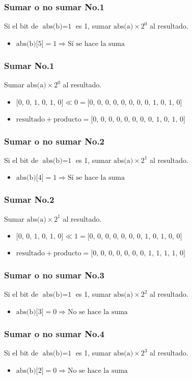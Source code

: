 \documentclass{beamer}
\begin{document}
\begin{frame}
\frametitle{Sumar o no sumar No.1}
Si el bit de $\text{abs(b)}=\text{1}$ es 1, sumar $\text{abs(a)}\times\text{2}^{\text{0}}$ al resultado.
\begin{itemize}
\item $\text{abs(b)[5]}=\text{1}\Longrightarrow\text{Sí se hace la suma}$
\end{itemize}
\end{frame}
\begin{frame}
\frametitle{Sumar No.1}
Sumar $\text{abs(a)}\times\text{2}^{\text{0}}$ al resultado.
\begin{itemize}
\item $\text{[0, 0, 1, 0, 1, 0]}\ll\text{0}=\text{[0, 0, 0, 0, 0, 0, 0, 0, 1, 0, 1, 0]}$
\item $\text{resultado}+\text{producto}=\text{[0, 0, 0, 0, 0, 0, 0, 0, 1, 0, 1, 0]}$
\end{itemize}
\end{frame}
\begin{frame}
\frametitle{Sumar o no sumar No.2}
Si el bit de $\text{abs(b)}=\text{1}$ es 1, sumar $\text{abs(a)}\times\text{2}^{\text{1}}$ al resultado.
\begin{itemize}
\item $\text{abs(b)[4]}=\text{1}\Longrightarrow\text{Sí se hace la suma}$
\end{itemize}
\end{frame}
\begin{frame}
\frametitle{Sumar No.2}
Sumar $\text{abs(a)}\times\text{2}^{\text{1}}$ al resultado.
\begin{itemize}
\item $\text{[0, 0, 1, 0, 1, 0]}\ll\text{1}=\text{[0, 0, 0, 0, 0, 0, 0, 1, 0, 1, 0, 0]}$
\item $\text{resultado}+\text{producto}=\text{[0, 0, 0, 0, 0, 0, 0, 1, 1, 1, 1, 0]}$
\end{itemize}
\end{frame}
\begin{frame}
\frametitle{Sumar o no sumar No.3}
Si el bit de $\text{abs(b)}=\text{1}$ es 1, sumar $\text{abs(a)}\times\text{2}^{\text{2}}$ al resultado.
\begin{itemize}
\item $\text{abs(b)[3]}=\text{0}\Longrightarrow\text{No se hace la suma}$
\end{itemize}
\end{frame}
\begin{frame}
\frametitle{Sumar o no sumar No.4}
Si el bit de $\text{abs(b)}=\text{1}$ es 1, sumar $\text{abs(a)}\times\text{2}^{\text{3}}$ al resultado.
\begin{itemize}
\item $\text{abs(b)[2]}=\text{0}\Longrightarrow\text{No se hace la suma}$
\end{itemize}
\end{frame}
\end{document}

